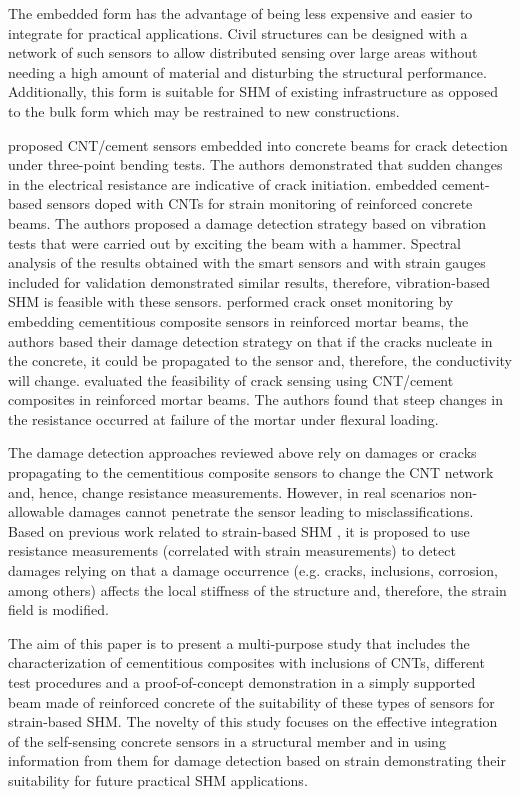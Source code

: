 \documentclass[twocolumn]{bmcart}%
\begin{document}
The embedded form has the advantage of being less expensive and easier to integrate for practical applications. Civil structures can be designed with a network of such sensors to allow distributed sensing over large areas without needing a high amount of material and disturbing the structural performance. Additionally, this form is suitable for SHM of existing infrastructure as opposed to the bulk form which may be restrained to new constructions. 

\citet{Saafi2009} proposed CNT/cement sensors embedded into concrete beams for crack detection under three-point bending tests. The authors demonstrated that sudden changes in the electrical resistance are indicative of crack initiation. \citet{DAlessandro2016b} embedded cement-based sensors doped with CNTs for strain monitoring of reinforced concrete beams. The authors proposed a damage detection strategy based on vibration tests that were carried out by exciting the beam with a hammer. Spectral analysis of the results obtained with the smart sensors and with strain gauges included for validation demonstrated similar results, therefore, vibration-based SHM is feasible with these sensors. \citet{Lim2017} performed crack onset monitoring by embedding  cementitious composite sensors in reinforced mortar beams, the authors based their damage detection strategy on that if the cracks nucleate in the concrete, it could be propagated to the sensor and, therefore, the conductivity will change. \citet{Naeem2017a} evaluated the feasibility of crack sensing using CNT/cement composites in reinforced mortar beams. The authors found that steep changes in the resistance occurred at failure of the mortar under flexural loading. 

The damage detection approaches reviewed above rely on damages or cracks propagating to the cementitious composite sensors to change the CNT network and, hence, change resistance measurements. However, in real scenarios non-allowable damages cannot penetrate the sensor leading to misclassifications. Based on previous work related to strain-based SHM \cite{Sierra-Perez2015, Sierra-Perez2018}, it is proposed to use resistance measurements (correlated with strain measurements) to detect damages relying on that a damage occurrence (e.g. cracks, inclusions, corrosion, among others) affects the local stiffness of the structure and, therefore, the strain field is modified.  

The aim of this paper is to present a multi-purpose study that includes the characterization of cementitious composites with inclusions of CNTs, different test procedures and a proof-of-concept demonstration in a simply supported beam made of reinforced concrete of the suitability of these types of sensors for strain-based SHM. The novelty of this study focuses on the effective integration of the self-sensing concrete sensors in a structural member and in using information from them for damage detection based on strain demonstrating their suitability for future practical SHM applications.
\end{document}
